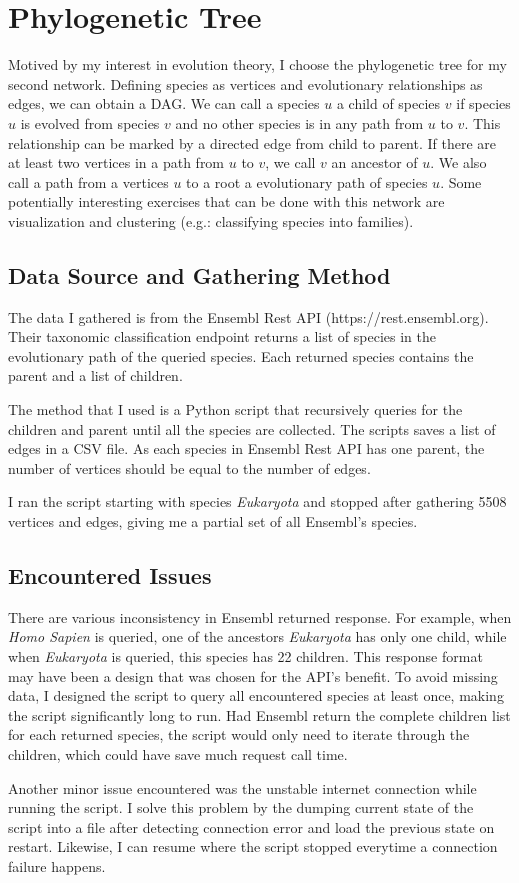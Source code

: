 \documentclass[10pt]{article}
\begin{document}
\section{Phylogenetic Tree}

Motived by my interest in evolution theory, I choose the phylogenetic tree for my second network. Defining species as vertices and evolutionary relationships as edges, we can obtain a DAG. We can call a species $u$ a child of species $v$ if species $u$ is evolved from species $v$ and no other species is in any path from $u$ to $v$. This relationship can be marked by a directed edge from child to parent. If there are at least two vertices in a path from $u$ to $v$, we call $v$ an ancestor of $u$. We also call a path from a vertices $u$ to a root a evolutionary path of species $u$. Some potentially interesting exercises that can be done with this network are visualization and clustering (e.g.: classifying species into families). 

\subsection{Data Source and Gathering Method}

The data I gathered is from the Ensembl Rest API (https://rest.ensembl.org). Their taxonomic classification endpoint returns a list of species in the evolutionary path of the queried species. Each returned species contains the parent and a list of children.

The method that I used is a Python script that recursively queries for the children and parent until all the species are collected. The scripts saves a list of edges in a CSV file. As each species in Ensembl Rest API has one parent, the number of vertices should be equal to the number of edges. 

I ran the script starting with species \emph{Eukaryota} and stopped after gathering 5508 vertices and edges, giving me a partial set of all Ensembl's species. 

\subsection{Encountered Issues}

There are various inconsistency in Ensembl returned response. For example, when \emph{Homo Sapien} is queried, one of the ancestors \emph{Eukaryota} has only one child, while when \emph{Eukaryota} is queried, this species has 22 children. This response format may have been a design that was chosen for the API's benefit. To avoid missing data, I designed the script to query all encountered species at least once, making the script significantly long to run. Had Ensembl return the complete children list for each returned species, the script would only need to iterate through the children, which could have save much request call time. 

Another minor issue encountered was the unstable internet connection while running the script. I solve this problem by the dumping current state of the script into a file after detecting connection error and load the previous state on restart. Likewise, I can resume where the script stopped everytime a connection failure happens. 
\end{document}
